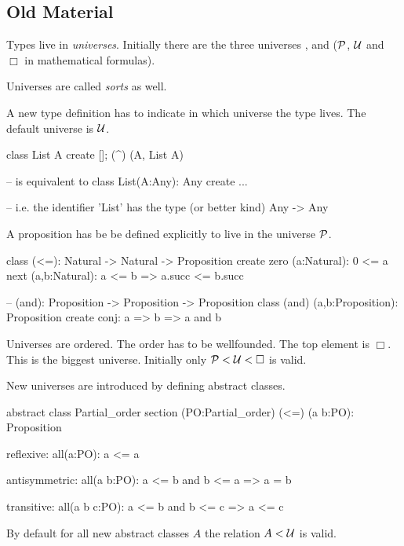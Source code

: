 \subsection{Old Material}

Types live in \emph{universes}. Initially there are the three universes
,  and  (${\cal{P}}$, ${\cal{U}}$ and $\Box$ in
mathematical formulas).

Universes are called \emph{sorts} as well.

A new type definition has to indicate in which universe the type lives. The
default universe is ${\cal{U}}$.

\begin{alba}
  class List A create [];  (^) (A, List A)

  -- is equivalent to
  class List(A:Any): Any create ...

  -- i.e. the identifier 'List' has the type (or better kind)
  Any -> Any
\end{alba}

A proposition has be be defined explicitly to live in the universe ${\cal{P}}$.
%
\begin{alba}
  class
    (<=): Natural -> Natural -> Proposition
  create
    zero (a:Natural): 0 <= a
    next (a,b:Natural): a <= b => a.succ <= b.succ

  -- (and): Proposition -> Proposition -> Proposition
  class
    (and) (a,b:Proposition): Proposition
  create
    conj: a => b => a and b
\end{alba}

Universes are ordered. The order has to be wellfounded. The top element is
$\Box$. This is the biggest universe. Initially only ${\cal{P}} < {\cal{U}} < \Box$ is
valid.

New universes are introduced by defining abstract classes.
\begin{alba}
  abstract
    class Partial_order
  section (PO:Partial_order)
    (<=) (a b:PO): Proposition

    reflexive:
      all(a:PO): a <= a

    antisymmetric:
      all(a b:PO):
        a <= b  and  b <= a
        =>  a = b

    transitive:
      all(a b c:PO):
        a <= b and b <= c
        => a <= c
\end{alba}
%
By default for all new abstract classes $A$ the relation $A < {\cal{U}}$ is
valid.

